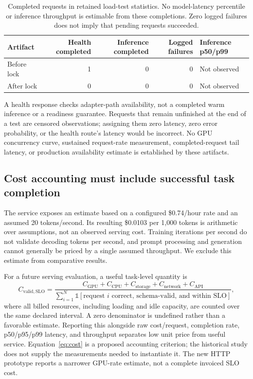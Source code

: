 \begin{table}[t]
\centering\small
\caption{Completed requests in retained load-test statistics. No model-latency percentile or inference throughput is estimable from these completions. Zero logged failures does not imply that pending requests succeeded.}
\label{tab:serving}
\begin{tabular}{lrrrl}
\toprule
Artifact & Health completed & Inference completed & Logged failures & Inference p50/p99 \\
\midrule
Before lock & 1 & 0 & 0 & Not observed \\
After lock & 0 & 0 & 0 & Not observed \\
\bottomrule
\end{tabular}
\end{table}

A health response checks adapter-path availability, not a completed warm inference or a readiness guarantee. Requests that remain unfinished at the end of a test are censored observations; assigning them zero latency, zero error probability, or the health route's latency would be incorrect. No GPU concurrency curve, sustained request-rate measurement, completed-request tail latency, or production availability estimate is established by these artifacts.

\subsection{Cost accounting must include successful task completion}
The service exposes an estimate based on a configured \$0.74/hour rate and an assumed 20 tokens/second. Its resulting \$0.0103 per 1,000 tokens is arithmetic over assumptions, not an observed serving cost. Training iterations per second do not validate decoding tokens per second, and prompt processing and generation cannot generally be priced by a single assumed throughput. We exclude this estimate from comparative results.

For a future serving evaluation, a useful task-level quantity is
\begin{equation}
 C_{\mathrm{valid,SLO}}=
 \frac{C_{\mathrm{GPU}}+C_{\mathrm{CPU}}+C_{\mathrm{storage}}+C_{\mathrm{network}}+C_{\mathrm{API}}}
 {\sum_{i=1}^{N}\mathbb{1}[\text{request }i\text{ correct, schema-valid, and within SLO}]},
\label{eq:cost}
\end{equation}
where all billed resources, including loading and idle capacity, are counted over the same declared interval. A zero denominator is undefined rather than a favorable estimate. Reporting this alongside raw cost/request, completion rate, p50/p95/p99 latency, and throughput separates low unit price from useful service. Equation~\ref{eq:cost} is a proposed accounting criterion; the historical study does not supply the measurements needed to instantiate it. The new HTTP prototype reports a narrower GPU-rate estimate, not a complete invoiced SLO cost.

